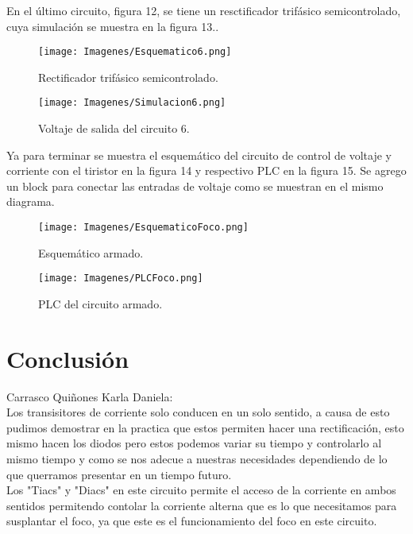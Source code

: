 \documentclass[letterpaper]{article}
\begin{document}
\newpage
En el último circuito, figura 12, se tiene un resctificador trifásico semicontrolado, cuya simulación se muestra en la figura 13..

\begin{figure}[ht]
    \centering
    \texttt{[image: Imagenes/Esquematico6.png]}
    \caption{Rectificador trifásico semicontrolado.}
    \label{fig:my_labe20}
\end{figure}
\begin{figure}[ht]
    \centering
    \texttt{[image: Imagenes/Simulacion6.png]}
    \caption{Voltaje de salida del circuito 6.}
    \label{fig:my_labe21}
\end{figure}

\newpage
Ya para terminar se muestra el esquemático del circuito de control de voltaje y corriente con el tiristor en la figura 14 y respectivo PLC en la figura 15. Se agrego un block para conectar las entradas de voltaje como se muestran en el mismo diagrama.
\begin{figure}[ht]
    \centering
    \texttt{[image: Imagenes/EsquematicoFoco.png]}
    \caption{Esquemático armado.}
    \label{fig:my_labe22}
\end{figure}
\begin{figure}[ht]
    \centering
    \texttt{[image: Imagenes/PLCFoco.png]}
    \caption{PLC del circuito armado.}
    \label{fig:my_labe23}
\end{figure}

\section{Conclusión}
Carrasco Quiñones Karla Daniela:
\\Los transisitores de corriente solo conducen en un solo sentido, a causa de esto pudimos demostrar en la practica que estos permiten hacer una rectificación, esto mismo hacen los diodos pero estos podemos variar su tiempo y controlarlo al mismo tiempo y como se nos adecue a nuestras necesidades dependiendo de lo que querramos presentar en un tiempo futuro.\\
Los "Tiacs" y "Diacs" en este circuito permite el acceso de la corriente en ambos sentidos permitendo contolar la corriente alterna que es lo que necesitamos para susplantar el foco, ya que este es el funcionamiento del foco en este circuito.
\end{document}
